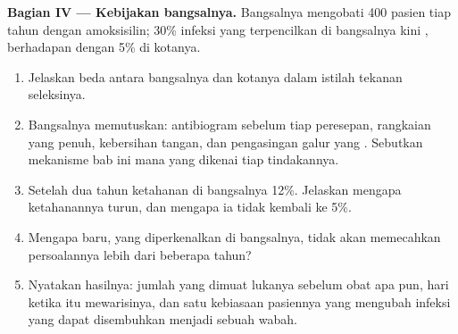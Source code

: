 \begin{problem}
\medskip
\noindent\textbf{Bagian IV --- Kebijakan bangsalnya.}
Bangsalnya mengobati 400 pasien tiap tahun dengan amoksisilin; 30\%
infeksi yang terpencilkan di bangsalnya kini , berhadapan dengan
5\% di kotanya.
\begin{enumerate}[resume]
  \item Jelaskan beda antara bangsalnya dan kotanya dalam istilah
        tekanan seleksinya.
  \item Bangsalnya memutuskan: antibiogram sebelum tiap peresepan,
        rangkaian yang penuh, kebersihan tangan, dan pengasingan
         galur yang . Sebutkan mekanisme bab ini mana yang
        dikenai tiap tindakannya.
  \item Setelah dua tahun ketahanan di bangsalnya 12\%. Jelaskan
        mengapa ketahanannya turun, dan mengapa ia tidak kembali ke 5\%.
  \item Mengapa  baru, yang diperkenalkan di bangsalnya,
        tidak akan memecahkan persoalannya lebih dari beberapa tahun?
  \item Nyatakan hasilnya: jumlah   yang dimuat lukanya sebelum
        obat apa pun, hari ketika  itu mewarisinya, dan satu
        kebiasaan pasiennya yang mengubah infeksi yang dapat
        disembuhkan menjadi sebuah wabah.
\end{enumerate}
\end{problem}
